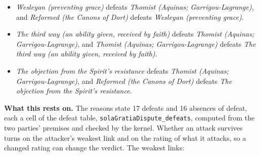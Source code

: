 \documentclass[11pt]{article}
\begin{document}
\begin{itemize}
\begin{itemize}
\item \emph{Wesleyan (preventing grace)} defeats \emph{Thomist (Aquinas; Garrigou-Lagrange)}, and \emph{Reformed (the Canons of Dort)} defeats \emph{Wesleyan (preventing grace)}.
\item \emph{The third way (an ability given, received by faith)} defeats \emph{Thomist (Aquinas; Garrigou-Lagrange)}, and \emph{Thomist (Aquinas; Garrigou-Lagrange)} defeats \emph{The third way (an ability given, received by faith)}.
\item \emph{The objection from the Spirit’s resistance} defeats \emph{Thomist (Aquinas; Garrigou-Lagrange)}, and \emph{Reformed (the Canons of Dort)} defeats \emph{The objection from the Spirit’s resistance}.
\end{itemize}
\end{itemize}
\par\noindent\textbf{What this rests on.} The reasons state 17 defeats and 16 absences of defeat, each a cell of the defeat table, \texttt{sola\allowbreak{}Gratia\allowbreak{}Dispute\_\allowbreak{}defeats}, computed from the two parties' premises and checked by the kernel. Whether an attack survives turns on the attacker's weakest link and on the rating of what it attacks, so a changed rating can change the verdict. The weakest links:
\end{document}

